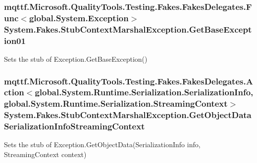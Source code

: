 \hypertarget{class_system_1_1_fakes_1_1_stub_context_marshal_exception_a6da555ee1c2357cd68796a374d35da8d}{
\subsubsection[{Get\-Base\-Exception01}]{\setlength{\rightskip}{0pt plus 5cm}mqttf.\-Microsoft.\-Quality\-Tools.\-Testing.\-Fakes.\-Fakes\-Delegates.\-Func$<$global.\-System.\-Exception$>$ System.\-Fakes.\-Stub\-Context\-Marshal\-Exception.\-Get\-Base\-Exception01}}\label{class_system_1_1_fakes_1_1_stub_context_marshal_exception_a6da555ee1c2357cd68796a374d35da8d}


Sets the stub of Exception.\-Get\-Base\-Exception()

\hypertarget{class_system_1_1_fakes_1_1_stub_context_marshal_exception_a362381ef38c583b3dddb3f00c43c9770}{
\subsubsection[{Get\-Object\-Data\-Serialization\-Info\-Streaming\-Context}]{\setlength{\rightskip}{0pt plus 5cm}mqttf.\-Microsoft.\-Quality\-Tools.\-Testing.\-Fakes.\-Fakes\-Delegates.\-Action$<$global.\-System.\-Runtime.\-Serialization.\-Serialization\-Info, global.\-System.\-Runtime.\-Serialization.\-Streaming\-Context$>$ System.\-Fakes.\-Stub\-Context\-Marshal\-Exception.\-Get\-Object\-Data\-Serialization\-Info\-Streaming\-Context}}\label{class_system_1_1_fakes_1_1_stub_context_marshal_exception_a362381ef38c583b3dddb3f00c43c9770}


Sets the stub of Exception.\-Get\-Object\-Data(\-Serialization\-Info info, Streaming\-Context context)

